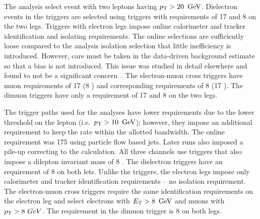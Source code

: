 The \hpt analysis select event with two leptons having $p_{\mathrm{T}} > 20\ \,\text{Ge\hspace{-.08em}V}$.
Dielectron events in the \hpt triggers are selected using triggers with
\Et requirements of 17 and 8 \GeV on the two legs. Triggers with electron
legs impose online calorimeter and tracker identification and isolating
requirements. The online selections are sufficiently loose compared to the
analysis isolation selection that little inefficiency is introduced. However,
care must be taken in the data-driven background estimate so that a bias is not
introduced. This issue was studied in detail elsewhere and found to not be a
significant concern~\cite{an_ufl2013}. The electron-muon cross triggers have
muon \pt requirements of 17 \GeV (8 \GeV) and corresponding \Et requirements of
8 \GeV (17 \GeV). The dimuon triggers have only a \pt requirement of
17 and 8 \GeV on the two legs.

The trigger paths used for the \lpt analyses have lower \pt
requirements due to the lower threshold on the lepton (i.e.~$p_{\mathrm{T}} > 10\ \,\text{Ge\hspace{-.08em}V}$);
however, they impose an additional \HT requirement to keep the rate within the
allotted bandwidth. The online \HT requirement was 175 \GeV using particle flow
based jets. Later runs also imposed a pile-up correcting to the \HT calculation.
All three channels use triggers that also impose a dilepton invariant mass of
8 \GeV. The dielectron triggers have an \Et requirement of 8 \GeV on both
lets. Unlike the \hpt triggers, the electron legs impose only calorimeter
and tracker identification requirements -- no isolation requirement. The
electron-muon cross triggers require the same identification requirements on
the electron leg and select electrons with $E_{\mathrm{T}} > 8\ \,\text{Ge\hspace{-.08em}V}$ and muons with $p_{\mathrm{T}}
> 8\ GeV$. The \pt requirement in the dimuon trigger is 8 \GeV on both legs.

